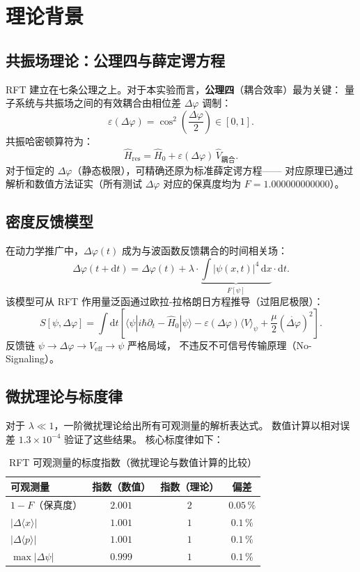 \documentclass[a4paper,11pt]{article}
\begin{document}
\newpage
\tableofcontents
\newpage

\section{理论背景}

\subsection{共振场理论：公理四与薛定谔方程}

RFT 建立在七条公理之上。对于本实验而言，\textbf{公理四}（耦合效率）最为关键：
量子系统与共振场之间的有效耦合由相位差 $\Delta\varphi$ 调制：
\[
  \varepsilon(\Delta\varphi) = \cos^2\!\left(\frac{\Delta\varphi}{2}\right) \in [0, 1].
\]
共振哈密顿算符为：
\[
  \hat{H}_{\mathrm{res}} = \hat{H}_0 + \varepsilon(\Delta\varphi)\,\hat{V}_{\mathrm{耦合}}.
\]
对于恒定的 $\Delta\varphi$（静态极限），可精确还原为标准薛定谔方程——
对应原理已通过解析和数值方法证实（所有测试 $\Delta\varphi$ 对应的保真度均为
$F = 1{.}000000000000$）。

\subsection{密度反馈模型}

在动力学推广中，$\Delta\varphi(t)$ 成为与波函数反馈耦合的时间相关场：
\[
  \Delta\varphi(t + \mathrm{d}t) = \Delta\varphi(t)
  + \lambda \cdot \underbrace{\int |\psi(x,t)|^4\,\mathrm{d}x}_{F[\psi]} \cdot \mathrm{d}t.
\]
该模型可从 RFT 作用量泛函通过欧拉-拉格朗日方程推导（过阻尼极限）：
\[
  S[\psi, \Delta\varphi] = \int \mathrm{d}t \left[
    \langle\psi|i\hbar\partial_t - \hat{H}_0|\psi\rangle
    - \varepsilon(\Delta\varphi)\langle V\rangle_\psi
    + \frac{\mu}{2}(\dot{\Delta\varphi})^2
  \right].
\]
反馈链 $\psi \to \Delta\varphi \to V_{\mathrm{eff}} \to \psi$ 严格局域，
不违反不可信号传输原理（No-Signaling）。

\subsection{微扰理论与标度律}

对于 $\lambda \ll 1$，一阶微扰理论给出所有可观测量的解析表达式。
数值计算以相对误差 $1{.}3 \times 10^{-4}$ 验证了这些结果。
核心标度律如下：

\begin{table}[h]
\centering
\caption{RFT 可观测量的标度指数（微扰理论与数值计算的比较）}
\begin{tabular}{lccc}
\toprule
可观测量 & 指数（数值） & 指数（理论） & 偏差 \\
\midrule
$1 - F$（保真度） & $2{.}001$ & $2$ & $0{.}05\,\%$ \\
$|\Delta\langle x\rangle|$ & $1{.}001$ & $1$ & $0{.}1\,\%$ \\
$|\Delta\langle p\rangle|$ & $1{.}001$ & $1$ & $0{.}1\,\%$ \\
$\max|\Delta\psi|$ & $0{.}999$ & $1$ & $0{.}1\,\%$ \\
\bottomrule
\end{tabular}
\end{table}
\end{document}
